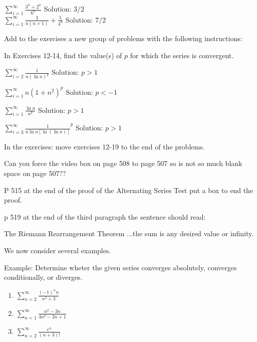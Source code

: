 \documentclass[10pt]{article}
\newcommand{\ds}{\displaystyle}
\begin{document}
$\ds \sum_{i=1}^{\infty} \frac{3^n+2^n}{6^{n}}$		Solution: $3/2$\\

$\ds \sum_{i=1}^{\infty} \frac{3}{n(n+1)}+\frac{5}{4^n}$	Solution: $7/2$


Add to the exercises a new group of problems with the following instructions:

In Exercises 12-14, find the value(s) of $p$ for which the series is convergent.

$\ds \sum_{i=2}^{\infty} \frac{1}{n(\ln n)^p}$		Solution: $p>1$

$\ds \sum_{i=1}^{\infty} n(1+n^2)^p$		Solution: $p<-1$

$\ds \sum_{i=1}^{\infty} \frac{\ln n}{n^p}$		Solution: $p>1$

$\ds \sum_{i=3}^{\infty} \frac{1}{n\ln n[\ln(\ln n)]}^p$	Solution: $p>1$



In the exercises: move exercises 12-19 to the end of the problems.



Can you force the video box on page 508 to page 507 so is not so much blank space on page 507??


P 515 at the end of the proof of the Alternating Series Test put a box to end the proof.

p 519 at the end of the third paragraph the sentence should read:

The Riemann Rearrangement Theorem ...the sum is any desired value or infinity.



We now consider several examples.

Example: Determine wheter the given series converges absolutely, converges conditionally, or diverges.

\begin{enumerate}
\item $\ds \sum_{n=2}^{\infty} \frac{(-1)^nn}{n^2+3}$

\item $\ds \sum_{n=1}^{\infty} \frac{n^2-3n}{4n^2-2n+1}$

\item $\ds \sum_{n=2}^{\infty} \frac{e^n}{(n+3)!}$

\end{enumerate}
\end{document}
